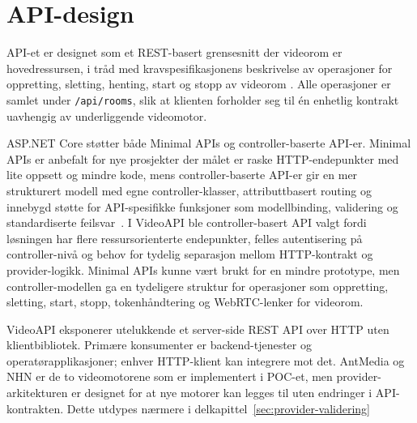 \section{API-design}
\label{sec:api-design}

API-et er designet som et REST-basert grensesnitt der videorom er hovedressursen, i tråd med kravspesifikasjonens beskrivelse av operasjoner for oppretting, sletting, henting, start og stopp av videorom \cite{hdo_kravspec}. Alle operasjoner er samlet under \texttt{/api/rooms}, slik at klienten forholder seg til én enhetlig kontrakt uavhengig av underliggende videomotor.


ASP.NET Core støtter både Minimal APIs og controller-baserte API-er. Minimal APIs
er anbefalt for nye prosjekter der målet er raske HTTP-endepunkter med lite
oppsett og mindre kode, mens controller-baserte API-er gir en mer strukturert
modell med egne controller-klasser, attributtbasert routing og innebygd støtte
for API-spesifikke funksjoner som modellbinding, validering og standardiserte
feilsvar~\cite{microsoft_aspnet_apis,microsoft_aspnet_webapi}. I VideoAPI ble
controller-basert API valgt fordi løsningen har flere ressursorienterte
endepunkter, felles autentisering på controller-nivå og behov for tydelig
separasjon mellom HTTP-kontrakt og provider-logikk. Minimal APIs kunne vært brukt
for en mindre prototype, men controller-modellen ga en tydeligere struktur for
operasjoner som oppretting, sletting, start, stopp, tokenhåndtering og
WebRTC-lenker for videorom.

VideoAPI eksponerer utelukkende et server-side REST API over HTTP uten
klientbibliotek. Primære konsumenter er backend-tjenester og operatørapplikasjoner;
enhver HTTP-klient kan integrere mot det. AntMedia og NHN er de to videomotorene
som er implementert i POC-et, men provider-arkitekturen er designet
for at nye motorer kan legges til uten endringer i API-kontrakten. Dette utdypes nærmere i delkapittel~\ref{sec:provider-validering}


